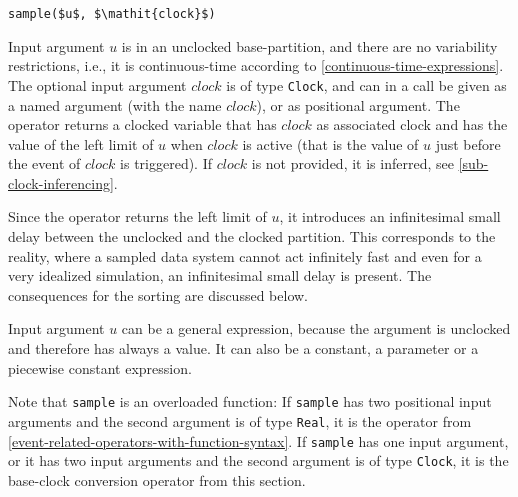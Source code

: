 \begin{operatordefinition*}[sample]\label{modelica:clocked-sample}
\begin{synopsis}\begin{lstlisting}
sample($u$, $\mathit{clock}$)
\end{lstlisting}\end{synopsis}
\begin{semantics}
Input argument $u$ is in an unclocked base-partition, and there are no variability restrictions, i.e., it is continuous-time according to \cref{continuous-time-expressions}.
The optional input argument $\mathit{clock}$ is of type \lstinline!Clock!, and can in a call be given as a named argument (with the name $\mathit{clock}$), or as positional argument.
The operator returns a clocked variable that has $\mathit{clock}$ as associated clock and has the value of the left limit of $u$ when $\mathit{clock}$ is active (that is the value of $u$ just before the event of $\mathit{clock}$ is triggered).
If $\mathit{clock}$ is not provided, it is inferred, see \cref{sub-clock-inferencing}.
\begin{nonnormative}
Since the operator returns the left limit of $u$, it introduces an infinitesimal small delay between the unclocked and the clocked partition.
This corresponds to the reality, where a sampled data system cannot act infinitely fast and even for a very idealized simulation, an infinitesimal small delay is present.
The consequences for the sorting are discussed below.

Input argument $u$ can be a general expression, because the argument is unclocked and therefore has always a value.
It can also be a constant, a parameter or a piecewise constant expression.

Note that \lstinline!sample! is an overloaded function:
If \lstinline!sample! has two positional input arguments and the second argument is of type \lstinline!Real!, it is the operator from \cref{event-related-operators-with-function-syntax}.
If \lstinline!sample! has one input argument, or it has two input arguments and the second argument is of type \lstinline!Clock!, it is the base-clock conversion operator from this section.
\end{nonnormative}
\end{semantics}
\end{operatordefinition*}

